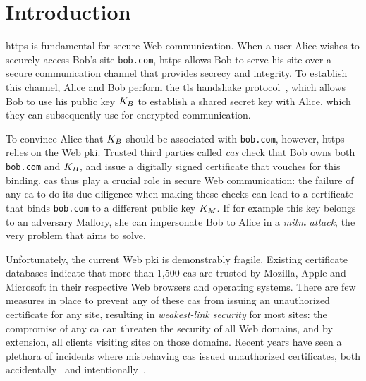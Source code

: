 \section{Introduction}
\label{sec:intro}


\acs{https} is fundamental for secure Web communication. When a user Alice
wishes to securely access Bob's site \texttt{bob.com}, \ac{https} allows Bob to
serve his site over a secure communication channel that provides secrecy and
integrity. To establish this channel, Alice and Bob perform the \ac{tls}
handshake protocol~\cite{rfc5246}, which allows Bob to use his public key
$K_B$ to establish a shared secret key with Alice, which they can subsequently
use for encrypted communication.

To convince Alice that $K_B$ should be associated with \texttt{bob.com},
however, \ac{https} relies on the Web \ac{pki}. Trusted third parties called
\emph{\acp{ca}} check that Bob owns both \texttt{bob.com} and $K_B$, and issue
a digitally signed certificate that vouches for this binding. \acp{ca} thus play
a crucial role in secure Web communication: the failure of any \ac{ca} to do its
due diligence when making these checks can lead to a certificate that binds
\texttt{bob.com} to a different public key $K_M$. If for example this key
belongs to an adversary Mallory, she can impersonate Bob to Alice in a
\emph{\ac{mitm} attack}, the very problem that  aims to solve.

Unfortunately, the current Web \ac{pki} is demonstrably fragile. Existing
certificate databases indicate that more than 1,500 \acp{ca} are trusted by
Mozilla, Apple and Microsoft in their respective Web browsers and operating
systems. There are few measures in place to prevent any of these \acp{ca} from
issuing an unauthorized certificate for any site, resulting in
\emph{weakest-link security} for most sites: the compromise of any \ac{ca} can
threaten the security of all Web domains, and by extension, all clients visiting
sites on those domains. Recent years have seen a plethora of incidents where
misbehaving \acp{ca} issued unauthorized certificates, both
accidentally~\cite{sleevi2015sustaining} and
intentionally~\cite{valsorda2015komodia}.

